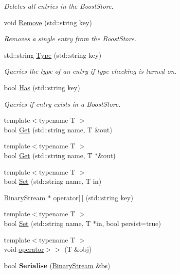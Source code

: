 \begin{DoxyCompactItemize}
\begin{DoxyCompactList}\small\item\em Deletes all entries in the Boost\-Store. \end{DoxyCompactList}\item 
void \hyperlink{classBStore_a6a8bfbede11adc57503efeca395dd5b4}{Remove} (std\-::string key)
\begin{DoxyCompactList}\small\item\em Removes a single entry from the Boost\-Store. \end{DoxyCompactList}\item 
std\-::string \hyperlink{classBStore_a1a2e9beec6992ed4f7ef1c01c211c955}{Type} (std\-::string key)
\begin{DoxyCompactList}\small\item\em Queries the type of an entry if type checking is turned on. \end{DoxyCompactList}\item 
bool \hyperlink{classBStore_aee9b4f22889fc26c3f8f67b0bed3776d}{Has} (std\-::string key)
\begin{DoxyCompactList}\small\item\em Queries if entry exists in a Boost\-Store. \end{DoxyCompactList}\item 
{\footnotesize template$<$typename T $>$ }\\bool \hyperlink{classBStore_a42f6ced1ecba93e1ef648ce17245e4fe}{Get} (std\-::string name, T \&out)
\item 
{\footnotesize template$<$typename T $>$ }\\bool \hyperlink{classBStore_acede0b4514b44fe9c3e1cb1e09c359e1}{Get} (std\-::string name, T $\ast$\&out)
\item 
{\footnotesize template$<$typename T $>$ }\\bool \hyperlink{classBStore_a3013181605a91ea0676ca65c9b14e3c3}{Set} (std\-::string name, T in)
\item 
\hyperlink{classBinaryStream}{Binary\-Stream} $\ast$ \hyperlink{classBStore_adcea1522f4c8adcc92a04a825cb84c3d}{operator\mbox{[}$\,$\mbox{]}} (std\-::string key)
\item 
{\footnotesize template$<$typename T $>$ }\\bool \hyperlink{classBStore_a764ca4d945cb90ddd1bb422b46016769}{Set} (std\-::string name, T $\ast$in, bool persist=true)
\item 
{\footnotesize template$<$typename T $>$ }\\void \hyperlink{classBStore_a7594a567b2c3d718781efbb0f411888a}{operator$>$$>$} (T \&obj)
\item 
\hypertarget{classBStore_aad69a5bed1adbf77c47bff31b3509880}{bool {\bfseries Serialise} (\hyperlink{classBinaryStream}{Binary\-Stream} \&bs)}\label{classBStore_aad69a5bed1adbf77c47bff31b3509880}

\end{DoxyCompactItemize}
